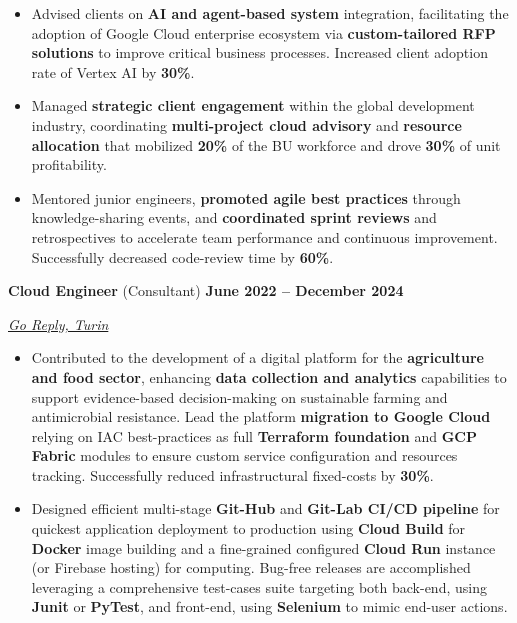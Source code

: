 \documentclass[9pt, a4paper]{article}
\newcommand{\jobsection}[3]{%
	\par {\large #1} \hfill {\bfseries #2} \par {\textit{#3}} \vspace{4pt}
}
\begin{document}
\begin{minipage}[t]{0.65\linewidth}
\begin{itemize}[leftmargin=*, nosep]
			\vspace{5pt}		
			\item \footnotesize Advised clients on \textbf{AI and agent-based system} integration, facilitating the adoption of Google Cloud enterprise ecosystem via \textbf{custom-tailored RFP solutions} to improve critical business processes.
			Increased client adoption rate of Vertex AI by \textbf{30\%}.  
			
			\vspace{5pt}
			\item \footnotesize Managed \textbf{strategic client engagement} within the global development industry, coordinating \textbf{multi-project cloud advisory} and \textbf{resource allocation} that mobilized \textbf{20\%} of the BU workforce and drove \textbf{30\%} of unit profitability.
			
			\vspace{5pt}
			\item \footnotesize Mentored junior engineers, \textbf{promoted agile best practices} through knowledge-sharing events, and \textbf{coordinated sprint reviews} and retrospectives to accelerate team performance and continuous improvement. 
			Successfully decreased code-review time by \textbf{60\%}.  
		\end{itemize}
		
		\vspace{6pt}
		\jobsection{\textbf{Cloud Engineer} (Consultant)}{June 2022 -- December 2024}{\href{https://www.reply.com/go-reply/en}{Go Reply, Turin}}
		\begin{itemize}[leftmargin=*, nosep]
			
			\item \footnotesize Contributed to the development of a digital platform for the \textbf{agriculture and food sector}, enhancing \textbf{data collection and analytics} capabilities to support evidence-based decision-making on sustainable farming and antimicrobial resistance. 
			Lead the platform \textbf{migration to Google Cloud} relying on IAC best-practices as full \textbf{Terraform foundation} and \textbf{GCP Fabric} modules to ensure custom service configuration and resources tracking.
			Successfully reduced infrastructural fixed-costs by \textbf{30\%}.
			
			\vspace{5pt}
			\item \footnotesize Designed efficient multi-stage \textbf{Git-Hub} and \textbf{Git-Lab CI/CD pipeline} for quickest application deployment to production using \textbf{Cloud Build} for \textbf{Docker} image building and a fine-grained configured \textbf{Cloud Run} instance (or Firebase hosting) for computing. Bug-free releases are accomplished leveraging a comprehensive test-cases suite targeting both back-end, using \textbf{Junit} or \textbf{PyTest}, and front-end, using \textbf{Selenium} to mimic end-user actions.       
			

\end{itemize}
\end{minipage}
\end{document}

